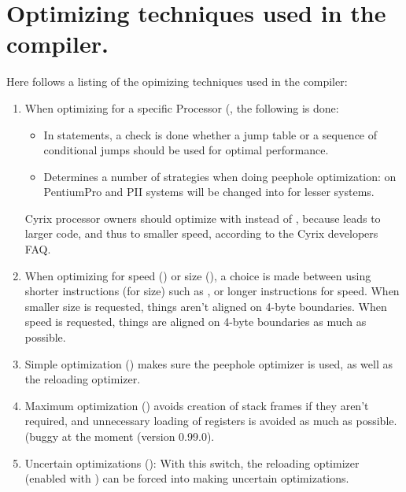 \documentclass{report}
\begin{document}
\chapter{Optimizing techniques used in the compiler.}
Here follows a listing of the opimizing techniques used in the compiler:
\begin{enumerate}
\item When optimizing for a specific Processor (, 
the following is done:
\begin{itemize}
\item In  statements, a check is done whether a jump table
or a sequence of conditional jumps should be used for optimal performance.
\item Determines a number of strategies when doing peephole optimization:
 on PentiumPro and PII systems will be changed
into  for lesser systems.
\end{itemize}
Cyrix  processor owners should optimize with  instead of
, because  leads to larger code, and thus to smaller
speed, according to the Cyrix developers FAQ.
  \item When optimizing for speed () or size (), a choice is
made between using shorter instructions (for size) such as ,
or longer instructions  for speed. When smaller size is
requested, things aren't aligned on 4-byte boundaries.  When speed is
requested, things are aligned on 4-byte boundaries as much as possible.
\item Simple optimization () makes sure the peephole optimizer is
used, as well as the reloading optimizer.
\item Maximum optimization () avoids creation of stack frames if
they aren't required, and unnecessary loading of registers is avoided as
much as possible. (buggy at the moment (version 0.99.0).
\item Uncertain optimizations (): With this switch, the reloading 
optimizer (enabled with ) can be forced into making uncertain 
optimizations.


\end{enumerate}
\end{document}
